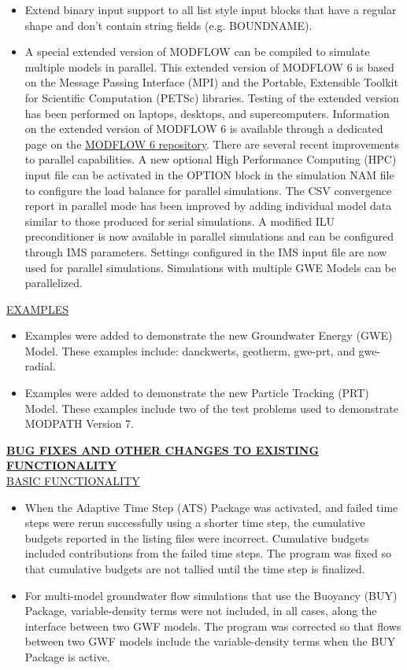 \begin{itemize}
		\item Extend binary input support to all list style input blocks that have a regular shape and don't contain string fields (e.g. BOUNDNAME).
		\item A special extended version of MODFLOW can be compiled to simulate multiple models in parallel.  This extended version of MODFLOW 6 is based on the Message Passing Interface (MPI) and the Portable, Extensible Toolkit for Scientific Computation (PETSc) libraries.  Testing of the extended version has been performed on laptops, desktops, and supercomputers.  Information on the extended version of MODFLOW 6 is available through a dedicated page on the \href{https://github.com/MODFLOW-USGS/modflow6/wiki/Parallel-MODFLOW-User-Guide}{MODFLOW 6 repository}.  There are several recent improvements to parallel capabilities.  A new optional High Performance Computing (HPC) input file can be activated in the OPTION block in the simulation NAM file to configure the load balance for parallel simulations. The CSV convergence report in parallel mode has been improved by adding individual model data similar to those produced for serial simulations.  A modified ILU preconditioner is now available in parallel simulations and can be configured through IMS parameters.  Settings configured in the IMS input file are now used for parallel simulations.  Simulations with multiple GWE Models can be parallelized.
	\end{itemize}

	\underline{EXAMPLES}
	\begin{itemize}
		\item Examples were added to demonstrate the new Groundwater Energy (GWE) Model.  These examples include: danckwerts, geotherm, gwe-prt, and gwe-radial.
		\item Examples were added to demonstrate the new Particle Tracking (PRT) Model.  These examples include two of the test problems used to demonstrate MODPATH Version 7.
	\end{itemize}

	\textbf{\underline{BUG FIXES AND OTHER CHANGES TO EXISTING FUNCTIONALITY}} \\
	\underline{BASIC FUNCTIONALITY}
	\begin{itemize}
		\item When the Adaptive Time Step (ATS) Package was activated, and failed time steps were rerun successfully using a shorter time step, the cumulative budgets reported in the listing files were incorrect.  Cumulative budgets included contributions from the failed time steps.  The program was fixed so that cumulative budgets are not tallied until the time step is finalized.
		\item For multi-model groundwater flow simulations that use the Buoyancy (BUY) Package, variable-density terms were not included, in all cases, along the interface between two GWF models.  The program was corrected so that flows between two GWF models include the variable-density terms when the BUY Package is active.
	\end{itemize}

